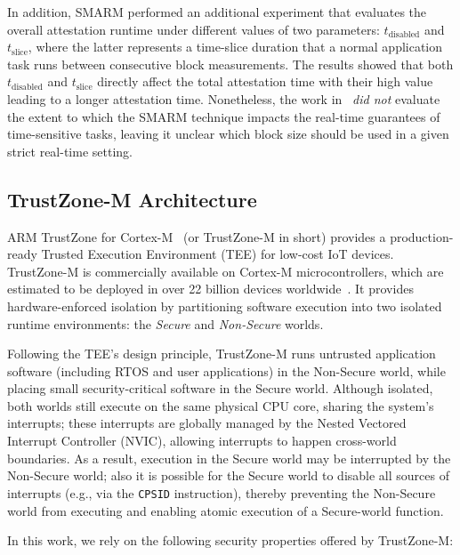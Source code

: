 \documentclass{ieeeaccess}
\begin{document}
In addition, SMARM performed an additional experiment that evaluates the overall attestation runtime under different values of two parameters: $t_{\text{disabled}}$ and $t_{\text{slice}}$, where the latter represents a time-slice duration that a normal application task runs between consecutive block measurements.
The results showed that both $t_{\text{disabled}}$ and $t_{\text{slice}}$ directly affect the total attestation time with their high value leading to a longer attestation time.
Nonetheless, the work in~\cite{smarm} \emph{did not} evaluate the extent to which the SMARM technique impacts the real-time guarantees of time-sensitive tasks, leaving it unclear which block size should be used in a given strict real-time setting.

\subsection{TrustZone-M Architecture}\label{subsec:tzm}



ARM TrustZone for Cortex-M~\cite{arm-trustzone-cm} (or TrustZone-M in short) provides a production-ready Trusted Execution Environment (TEE) for low-cost IoT devices.
TrustZone-M is commercially available on Cortex-M microcontrollers, which are estimated to be deployed in over 22 billion devices worldwide~\cite{armCommunity}.
It provides hardware-enforced isolation by partitioning software execution into two isolated runtime environments: the \emph{Secure} and \emph{Non-Secure} worlds.

Following the TEE's design principle, TrustZone-M runs untrusted application software (including RTOS and user applications) in the Non-Secure world, while placing small security-critical software in the Secure world.
Although isolated, both worlds still execute on the same physical CPU core, sharing the system's interrupts;
these interrupts are globally managed by the Nested Vectored Interrupt Controller (NVIC), allowing interrupts to happen cross-world boundaries.
As a result, execution in the Secure world may be interrupted by the Non-Secure world; also it is possible for the Secure world to disable all sources of interrupts (e.g., via the \texttt{CPSID} instruction), thereby preventing the Non-Secure world from executing and enabling atomic execution of a Secure-world function.

In this work, we rely on the following security properties offered by TrustZone-M:
\end{document}
